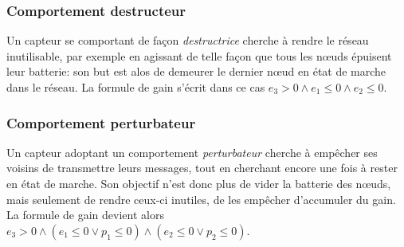         \subsubsection{Comportement destructeur}
Un capteur se comportant de façon \emph{destructrice} cherche à rendre le réseau inutilisable, par exemple en agissant de telle façon que tous les nœuds épuisent leur batterie: son but est alos de demeurer le dernier nœud en état de marche dans le réseau.
La formule de gain s'écrit dans ce cas $e_3 >0 \wedge e_1 \leq 0 \wedge e_2 \leq 0$.

        \subsubsection{Comportement perturbateur}
Un capteur adoptant un comportement \emph{perturbateur} cherche à empêcher ses voisins de transmettre leurs messages, tout en cherchant encore une fois à rester en état de marche.
Son objectif n'est donc plus de vider la batterie des nœuds, mais seulement de rendre ceux-ci inutiles, de les empêcher d'accumuler du gain.
La formule de gain devient alors $e_3 >0 \wedge (e_1 \leq 0 \vee p_1\leq0) \wedge (e_2 \leq 0 \vee p_2\leq0)$.
